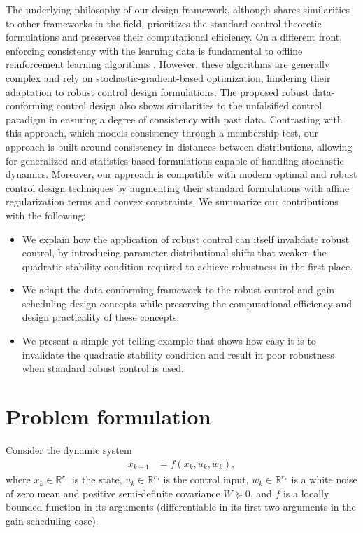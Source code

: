 \documentclass[letterpaper, 10 pt, conference]{ieeeconf}
\newcommand{\R}{\mathbb{R}}
\begin{document}
The underlying philosophy of our design framework, although shares similarities to other frameworks in the field, prioritizes the standard control-theoretic formulations and preserves their computational efficiency. On a different front, enforcing consistency with the learning data is fundamental to offline reinforcement learning algorithms \cite{agarwal2020optimistic}. However, these algorithms are generally complex \cite{fujimoto2021minimalist} and rely on stochastic-gradient-based optimization, hindering their adaptation to robust control design formulations. The proposed robust data-conforming control design also shows similarities to the unfalsified control paradigm \cite{cabral2004unfalsified} in ensuring a degree of consistency with past data. Contrasting with this approach, which models consistency through a membership test, our approach is built around consistency in distances between distributions, allowing for generalized and statistics-based formulations capable of handling stochastic dynamics. Moreover, our approach is compatible with modern optimal and robust control design techniques by augmenting their standard formulations with affine regularization terms and convex constraints. We summarize our contributions with the following:
\begin{itemize}
    \item We explain how the application of robust control can itself invalidate robust control, by introducing parameter distributional shifts that weaken the quadratic stability condition required to achieve robustness in the first place.
    \item We adapt the data-conforming framework to the robust control and gain scheduling design concepts while preserving the computational efficiency and design practicality of these concepts.
    \item We present a simple yet telling example that shows how easy it is to invalidate the quadratic stability condition and result in poor robustness when standard robust control is used.
\end{itemize}



\section{Problem formulation} \label{section: Problem Formulation}
Consider the dynamic system
\begin{align}
x_{k+1}&=f(x_k, u_k, w_k), \label{eq:stateEquation}
\end{align}
where $x_k\in\mathbb R^{r_x}$ is the state, $u_k\in\mathbb R^{r_u}$ is the control input, $w_k \in \R^{r_x}$ is a white noise of zero mean and positive semi-definite covariance $W \succeq 0$, and $f$ is a locally bounded function in its arguments (differentiable in its first two arguments in the gain scheduling case).
\end{document}
